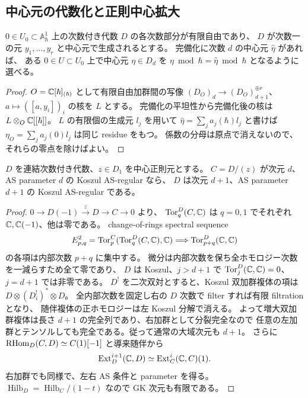 \subsection{中心元の代数化と正則中心拡大}
\begin{lemma}\label{lem:pg-algebraize-center}
$0\in U_0\subset\mathbb A^1_\hbar$ 上の次数付き代数 $D$ の各次数部分が有限自由であり、
$D$ が次数一の元 $y_1,\ldots,y_r$ と中心元で生成されるとする。
完備化に次数 $d$ の中心元 $\widehat\eta$ があれば、
ある $0\in U\subset U_0$ 上で中心元 $\eta\in D_d$ を
$\eta\bmod\hbar=\widehat\eta\bmod\hbar$ となるように選べる。
\end{lemma}
\begin{proof}
$O=\mathbb C[\hbar]_{(\hbar)}$ として有限自由加群間の写像
$(D_O)_d\to(D_O)_{d+1}^{\oplus r}$、$a\mapsto([a,y_i])_i$ の核を $L$ とする。
完備化の平坦性から完備化後の核は $L\otimes_O\mathbb C[[\hbar]]$。
$L$ の有限個の生成元 $l_j$ を用いて
$\widehat\eta=\sum_ja_j(\hbar)l_j$ と書けば
$\eta_O=\sum_ja_j(0)l_j$ は同じ residue をもつ。
係数の分母は原点で消えないので、それらの零点を除けばよい。
\end{proof}
\begin{lemma}\label{lem:pg-central-linear}
$D$ を連結次数付き代数、$z\in D_1$ を中心正則元とする。
$C=D/(z)$ が次元 $d$、AS parameter $d$ の Koszul AS-regular なら、
$D$ は次元 $d+1$、AS parameter $d+1$ の Koszul AS-regular である。
\end{lemma}
\begin{proof}
$0\to D(-1)\xrightarrow{z}D\to C\to0$ より、
$\operatorname{Tor}^D_q(C,\mathbb C)$ は $q=0,1$ でそれぞれ $\mathbb C,\mathbb C(-1)$、他は零である。
change-of-rings spectral sequence
\[
E^2_{p,q}=\operatorname{Tor}^C_p(\operatorname{Tor}^D_q(C,\mathbb C),\mathbb C)
\Longrightarrow\operatorname{Tor}^D_{p+q}(\mathbb C,\mathbb C)
\]
の各項は内部次数 $p+q$ に集中する。
微分は内部次数を保ち全ホモロジー次数を一減らすため全て零であり、
$D$ は Koszul、$j>d+1$ で $\operatorname{Tor}^D_j(\mathbb C,\mathbb C)=0$、$j=d+1$ では非零である。
$D^!$ を二次双対とすると、Koszul 双加群複体の項は $D\otimes(D_i^!)^*\otimes D$。
全内部次数を固定し右の $D$ 次数で filter すれば有限 filtration となり、
随伴複体の正ホモロジーは左 Koszul 分解で消える。
よって増大双加群複体は長さ $d+1$ の完全列であり、右加群として分裂完全なので
任意の左加群とテンソルしても完全である。従って通常の大域次元も $d+1$。
さらに $\operatorname{RHom}_D(C,D)\simeq C(1)[-1]$ と導来随伴から
\[
\operatorname{Ext}_D^{i+1}(\mathbb C,D)\simeq\operatorname{Ext}_C^i(\mathbb C,C)(1).
\]
右加群でも同様で、左右 AS 条件と parameter を得る。
$\operatorname{Hilb}_D=\operatorname{Hilb}_C/(1-t)$ なので GK 次元も有限である。
\end{proof}
